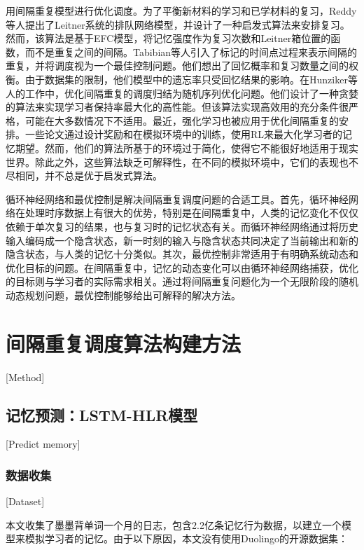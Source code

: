 用间隔重复模型进行优化调度。为了平衡新材料的学习和已学材料的复习，Reddy等人\cite{reddyUnboundedHumanLearning2016}提出了Leitner系统\cite{leitnerLerntManLeben1974}的排队网络模型，并设计了一种启发式算法来安排复习。然而，该算法是基于EFC模型\cite{reddyUnboundedHumanLearning2016}，将记忆强度作为复习次数和Leitner箱位置的函数，而不是重复之间的间隔。Tabibian等人\cite{tabibianEnhancingHumanLearning2019}引入了标记的时间点过程来表示间隔的重复，并将调度视为一个最佳控制问题。他们想出了回忆概率和复习数量之间的权衡。由于数据集的限制，他们模型中的遗忘率只受回忆结果的影响。在Hunziker等人\cite{hunzikerTeachingMultipleConcepts2019}的工作中，优化间隔重复的调度归结为随机序列优化问题。他们设计了一种贪婪的算法来实现学习者保持率最大化的高性能。但该算法实现高效用的充分条件很严格，可能在大多数情况下不适用。最近，强化学习也被应用于优化间隔重复的安排。一些论文\cite{reddyAcceleratingHumanLearning2017,upadhyayDeepReinforcementLearning2018,sinhaUsingDeepReinforcement2019,yangTADSLearningTimeaware2020}通过设计奖励和在模拟环境中的训练，使用RL来最大化学习者的记忆期望。然而，他们的算法所基于的环境过于简化，使得它不能很好地适用于现实世界。除此之外，这些算法缺乏可解释性，在不同的模拟环境中，它们的表现也不尽相同，并不总是优于启发式算法。

循环神经网络和最优控制是解决间隔重复调度问题的合适工具。首先，循环神经网络在处理时序数据上有很大的优势，特别是在间隔重复中，人类的记忆变化不仅仅依赖于单次复习的结果，也与复习时的记忆状态有关。而循环神经网络通过将历史输入编码成一个隐含状态，新一时刻的输入与隐含状态共同决定了当前输出和新的隐含状态，与人类的记忆十分类似。其次，最优控制非常适用于有明确系统动态和优化目标的问题。在间隔重复中，记忆的动态变化可以由循环神经网络捕获，优化的目标则与学习者的实际需求相关。通过将间隔重复问题化为一个无限阶段的随机动态规划问题，最优控制能够给出可解释的解决方法。

\chapter{间隔重复调度算法构建方法}[Method]

\section{记忆预测：LSTM-HLR模型}[Predict memory]

\subsection{数据收集}[Dataset]

本文收集了墨墨背单词一个月的日志，包含2.2亿条记忆行为数据，以建立一个模型来模拟学习者的记忆。由于以下原因，本文没有使用Duolingo的开源数据集：

